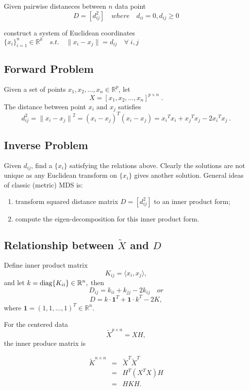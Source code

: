\documentclass[twoside]{article}
\theoremstyle{definition}
\theoremstyle{definition}
\theoremstyle{remark}
\def\diag{{\rm diag}}
\begin{document}
Given pairwise distaneces between $n$ data point 
$$ D = [d_{ij}^2] \quad where \quad d_{ii} = 0, d_{ij}\ge 0 $$

construct a system of Euclidean coordinates $\{x_i\}_{i=1}^n\in \mathbb{R}^k \quad s.t. \quad \|x_i-x_j\| =d_{ij} \quad \forall \; i,j$

\subsection{Forward Problem}

Given a set of points $x_1, x_2, ..., x_n \in \mathbb{R}^p$, let 
$$ X = [x_1, x_2, ..., x_n]^{p\times n}\;.$$
The distance between point $x_i$ and $x_j$ satisfies 
$$ d_{ij}^2 = {\|x_i - x_j\|}^2 = {(x_i-x_j)}^T(x_i-x_j) = {x_i}^T x_i + {x_j}^T x_j - 2{x_i}^Tx_j\ . $$

\subsection{Inverse Problem}
Given $d_{ij}$, find a $\{x_i\}$ satisfying the relations above. Clearly the solutions are not unique as any Euclidean transform on $\{x_i\}$ gives another solution. General ideas of classic (metric) MDS is:
\begin{enumerate}
\item transform squared distance matrix $D=[d_{ij}^2]$ to an inner product form;
\item compute the eigen-decomposition for this inner product form. 
\end{enumerate} 


\subsection{Relationship between $\tilde{X}$ and $D$}

Define inner product matrix 
$$ K_{ij} = \langle x_i,x_j\rangle, $$ 
and let $k = \diag \{K_{ii}\} \in \mathbb{R}^n,$ then 
$$D_{ij} = k_{ii} + k_{jj} - 2k_{ij} \quad or$$
$$ D = k\cdot {\mathbf{1}}^T + \mathbf{1} \cdot k^T -2K, $$
where $\mathbf{1} = (1,1,..., 1)^T \in \mathbb{R}^n$. 

For the centered data 
$$ \tilde{X}^{p\times n} = XH ,$$ 
the inner produce matrix is

\begin{eqnarray*}
\tilde{K}^{n \times n} &=& \tilde{X}^T \tilde{X}^T \\
 &=& H^T (X^TX)H \\
 &=& HKH.
\end{eqnarray*}
\end{document}
